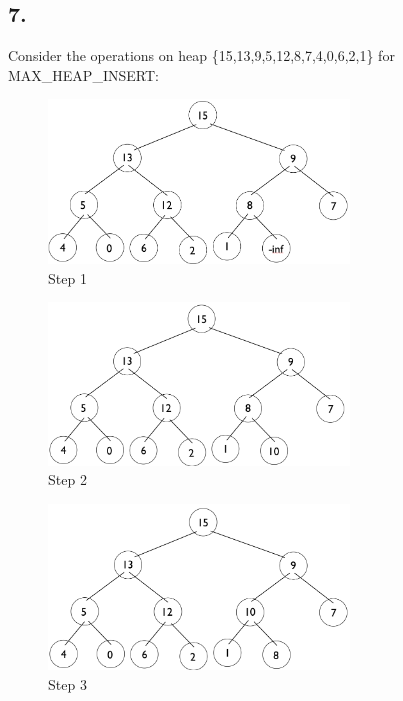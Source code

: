 \documentclass[11pt,letterpaper]{article}
\begin{document}
\pagebreak

\subsection*{7.}
Consider the operations on heap \{15,13,9,5,12,8,7,4,0,6,2,1\} for MAX\_HEAP\_INSERT:

\begin{figure}[!ht]

	\begin{center}
	\includegraphics[width=80mm]{images/6_5_2_1_tree.png}
	\end{center}

\caption{Step 1 }
\end{figure}

\begin{figure}[!ht]

	\begin{center}
	\includegraphics[width=80mm]{images/6_5_2_2_tree.png}
	\end{center}

\caption{Step 2 }
\end{figure}

\pagebreak

\begin{figure}[!ht]

	\begin{center}
	\includegraphics[width=80mm]{images/6_5_2_3_tree.png}
	\end{center}

\caption{Step 3 }
\end{figure}
\end{document}
